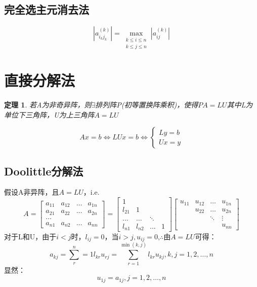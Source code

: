 \documentclass[a4paper]{article}
\newtheorem{theorem}{定理}[section]
\begin{document}
\subsection{完全选主元消去法}
$$|a^{(k)}_{i_kj_k}| = \max_{\substack{k \le i \le n \\ k\le j \le n}} |a^{(k)}_{ij}|$$

\section{直接分解法}

\begin{theorem}
  若A为非奇异阵，则$\exists$排列阵P(初等置换阵乘积)，使得$PA=LU$其中L为单位下三角阵，U为上三角阵$A=LU$
\end{theorem}

\begin{equation*}
  Ax=b \Leftrightarrow LUx = b \Leftrightarrow \left\{
    \begin{array}{lr}
      Ly = b \\
      Ux = y 
    \end{array}
    \right.
\end{equation*}

\subsection{Doolittle分解法}
假设A非异阵，且$A=LU$，i.e.
$$
A = \left[
  \begin{matrix}
    a_{11} & a_{12} & \dots & a_{1n} \\
    a_{21} & a_{22} & \dots & a_{2n} \\
    \dots \\
    a_{n1} & a_{n2} & \dots & a_{nn}
  \end{matrix}\right]=\left[
    \begin{matrix}
      1 \\
      l_{21} & 1 \\
      \dots & \dots & \ddots \\
      l_{n1} & l_{n2} & \dots & 1 
    \end{matrix}\right]
    \left[
      \begin{matrix}
        u_{11} & u_{12} & \dots & u_{1n} \\
        ~ & u_{22} & \dots & u_{2n} \\
        ~ & ~ & \ddots & \vdots \\
        ~ & ~ & ~ & u_{nn}
      \end{matrix}
      \right]
$$
对于L和U，由于$i<j$时，$l_{ij}=0$，当$i>j, u_{ij}=0$,$\therefore$由$A=LU$可得：
\begin{equation}
  a_{kj} = \sum^n_r=1l_{kr}u_{rj} = \sum_{r=1}^{\min(k,j)}l_{kr}u_{kj}, k,j = 1,2,\dots, n
  \label{eq:4.1}
\end{equation}
显然：
\begin{equation}
  u_{1j}=a_{1j},j=1,2,\dots, n 
  \label{eq:4.2}
\end{equation}
\end{document}
